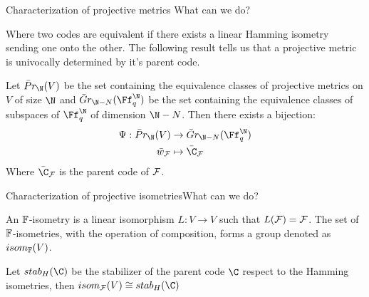 \begin{frame}{Characterization of projective metrics }{What can we do?}


Where two codes are equivalent if there exists a linear Hamming isometry sending one onto the other. The following result tells us that a projective metric is univocally determined by it's parent code.
\begin{theorem}
    
    Let $ \bar Pr_{\N}(V)$ be the set containing the equivalence classes of projective metrics on $V$ of size $\N$ and $\bar Gr_{\N-N}(\Ff_q^{\N})$ be the set containing the equivalence classes of subspaces of $\Ff^{\N}_q$ of dimension $\N - N$. Then there exists a bijection:
    \begin{align*}
    \Psi: \bar Pr_{\N}(V) &\to \bar Gr_{\N-N}(\Ff_q^{\N}) \\
    \bar w_{\cF} &\mapsto \bar \C_{\cF}
\end{align*}
    Where $\bar \C_{\cF}$ is the parent code of $\operatorname{\mathcal{F}}$.
\end{theorem}

\end{frame}
\begin{frame}{Characterization of projective isometries}{What can we do?}
    
\begin{definition}
    An \(\operatorname{\mathbb{F}}\)-isometry is a linear isomorphism \(L:V \to V\) such that \(L(\operatorname{\mathcal{F}}) = \operatorname{\mathcal{F}}\). The set of \(\operatorname{\mathbb{F}}\)-isometries, with the operation of composition, forms a group denoted as \(isom_{\operatorname{\mathbb{F}}}(V)\).
\end{definition}

\begin{theorem}
Let \(stab_H(\C)\) be the stabilizer of the parent code \(\C\) respect to the Hamming isometries, then \(isom_{\cF}(V) \cong stab_H(\C)\)
\end{theorem}

\end{frame}

